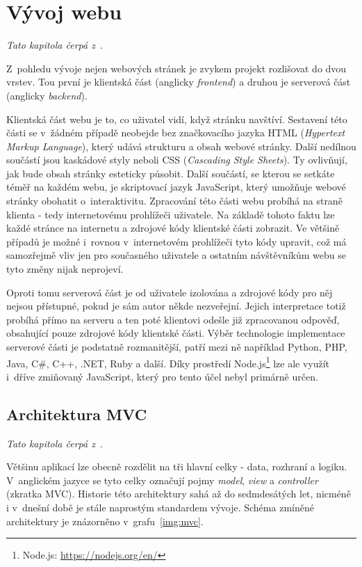 \section{Vývoj webu}
\emph{Tato kapitola čerpá z~\cite{bib:web-development}}.

Z~pohledu vývoje nejen webových stránek je zvykem projekt rozlišovat do dvou vrstev. Tou první je klientská část (anglicky \emph{frontend}) a druhou je serverová část (anglicky \emph{backend}).

Klientská část webu je to, co uživatel vidí, když stránku navštíví. Sestavení této části se v~žádném případě neobejde bez značkovacího jazyka HTML (\emph{Hypertext Markup Language}), který udává strukturu a obsah webové stránky. Další nedílnou součástí jsou kaskádové styly neboli CSS (\emph{Cascading Style Sheets}). Ty ovlivňují, jak bude obsah stránky esteticky působit. Další součástí, se kterou se setkáte téměř na každém webu, je skriptovací jazyk JavaScript, který umožňuje webové stránky obohatit o~interaktivitu.
Zpracování této části webu probíhá na straně klienta - tedy internetovému prohlížeči uživatele. Na základě tohoto faktu lze každé stránce na internetu  a zdrojové kódy klientské části zobrazit. Ve většině případů je možné i~rovnou v~internetovém prohlížeči tyto kódy upravit, což má samozřejmě vliv jen pro současného uživatele a ostatním návštěvníkům webu se tyto změny nijak neprojeví.

Oproti tomu serverová část je od uživatele izolována a zdrojové kódy pro něj nejsou přístupné, pokud je sám autor někde nezveřejní. Jejich interpretace totiž probíhá přímo na serveru a ten poté klientovi odešle již zpracovanou odpověď, obsahující pouze zdrojové kódy klientské části. Výběr technologie implementace serverové části je podstatně rozmanitější, patří mezi ně například Python, PHP, Java, C\#, C++, .NET, Ruby a další. Díky prostředí Node.js\footnote{Node.js: \url{https://nodejs.org/en/}} lze ale využít i~dříve zmiňovaný JavaScript, který pro tento účel nebyl primárně určen. 


\subsection{Architektura MVC}\label{section:mvc}
\emph{Tato kapitola čerpá z~\cite{bib:mvc}}.

Většinu aplikací lze obecně rozdělit na tři hlavní celky - data, rozhraní a logiku. V~anglickém jazyce se tyto celky označují pojmy \emph{model}, \emph{view} a \emph{controller} (zkratka MVC). Historie této architektury sahá až do sedmdesátých let, nicméně i v~dnešní době je stále naprostým standardem vývoje. Schéma zmíněné architektury je znázorněno v~grafu~\ref{img:mvc}.

